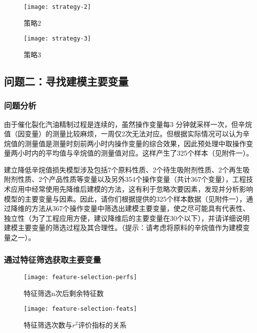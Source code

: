 \documentclass[bwprint]{gmcmthesis}
\begin{document}
\begin{figure}[htbp]
	\centering
	\texttt{[image: strategy-2]}
	\caption{策略2}
\end{figure}


\begin{figure}[htbp]
	\centering
	\texttt{[image: strategy-3]}
	\caption{策略3}
\end{figure}

\subsection{问题二：寻找建模主要变量}
\subsubsection{问题分析}

由于催化裂化汽油精制过程是连续的，虽然操作变量每3 分钟就采样一次，但辛烷值（因变量）的测量比较麻烦，一周仅2次无法对应。但根据实际情况可以认为辛烷值的测量值是测量时刻前两小时内操作变量的综合效果，因此预处理中取操作变量两小时内的平均值与辛烷值的测量值对应。这样产生了325个样本（见附件一）。

建立降低辛烷值损失模型涉及包括7个原料性质、2个待生吸附剂性质、2个再生吸附剂性质、2个产品性质等变量以及另外354个操作变量（共计367个变量），工程技术应用中经常使用先降维后建模的方法，这有利于忽略次要因素，发现并分析影响模型的主要变量与因素。因此，请你们根据提供的325个样本数据（见附件一），通过降维的方法从367个操作变量中筛选出建模主要变量，使之尽可能具有代表性、独立性（为了工程应用方便，建议降维后的主要变量在30个以下），并请详细说明建模主要变量的筛选过程及其合理性。（提示：请考虑将原料的辛烷值作为建模变量之一）。

\subsubsection{通过特征筛选获取主要变量}

\begin{figure}[htbp]
	\centering
	\texttt{[image: feature-selection-perfs]}
	\caption{特征筛选n次后剩余特征数}
\end{figure}

\begin{figure}[htbp]
	\centering
	\texttt{[image: feature-selection-feats]}
	\caption{特征筛选次数与$r^2$评价指标的关系}
\end{figure}
\end{document}
